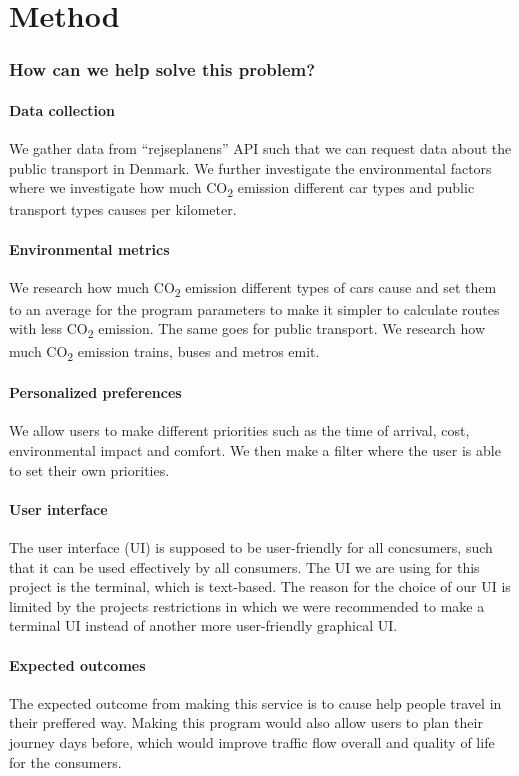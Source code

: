 \chapter{Method}\label{ch:method}

\subsection{How can we help solve this problem?}\label{subsec:how-can-we-help-solve-this-problem?}
\subsubsection{Data collection}
We gather data from ``rejseplanens'' API such that we can request data about the public transport in Denmark.
We further investigate the environmental factors where we investigate how much \unit{CO_{2}} emission
different car types and public transport types causes per kilometer.

\subsubsection{Environmental metrics}
We research how much \unit{CO_{2}} emission different types of cars cause and set them to an average for
the program parameters to make it simpler to calculate routes with less \unit{CO_{2}} emission.
The same goes for public transport. We research how much \unit{CO_{2}} emission trains, buses and
metros emit.

\subsubsection{Personalized preferences}
We allow users to make different priorities such as the time of arrival, cost, environmental impact and comfort.
We then make a filter where the user is able to set their own priorities.

\subsubsection{User interface}
The user interface (UI) is supposed to be user-friendly for all concsumers, such that it can be used effectively by all
consumers.
The UI we are using for this project is the terminal, which is text-based.
The reason for the choice of our UI is limited by the projects restrictions in which we were recommended to make a
terminal UI instead of another more user-friendly graphical UI.

\subsubsection{Expected outcomes}
The expected outcome from making this service is to cause help people travel in their preffered way.
Making this program would also allow users to plan their journey days before, which would improve traffic flow
overall and quality of life for the consumers.
